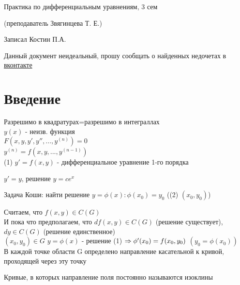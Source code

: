 \documentclass[12pt, fleqn]{article}
\begin{document}
\begin{center}
  \huge Практика по дифференциальным уравнениям, 3 сем

  \Large (преподаватель Звягинцева Т. Е.)

  \large Записал Костин П.А.
\end{center}

Данный документ неидеальный, прошу сообщать о найденных недочетах в \href{https://vk.com/drab_existence_a}{вконтакте}
\tableofcontents
\newpage

\section{Введение}
Разрешимо в квадратурах=разрешимо в интеграллах\\
$y(x)$ - неизв. функция\\
$F(x,y,y',y'',...,y^{(n)})=0$\\
$y^{(n)}=f(x,y,...,y^{(n-1)})$\\
(1) $y'=f(x,y)$ - дифференциальное уравнение 1-го порядка

\begin{example}
    $y'=y$, решение $y=c e^x$
\end{example}

\begin{definition}
    Задача Коши: найти решение $y=\phi(x): \phi(x_0)=y_0$ ((2) $(x_0,y_0)$)
\end{definition}

Считаем, что $f(x,y) \in C(G)$\\
И пока что предполагаем, что $d f(x,y) \in C(G)$ (решение существует), $dy \in C(G)$ (решение единственное)\\
$(x_0,y_0) \in G$ $y=\phi(x)$ - решение (1) $\Rightarrow \phi'(x_0)=f(x_0,y_0)$ $(y_0=\phi(x_0))$\\
В каждой точке области G определено направление касательной к кривой, проходящей через эту точку\\
\begin{definition}
    Кривые, в которых направление поля постоянно называются изоклины
\end{definition}
\end{document}
